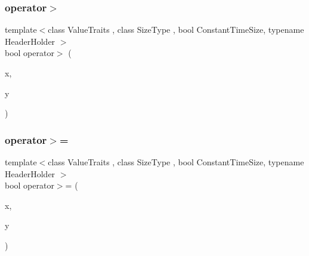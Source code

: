 \subsubsection{\texorpdfstring{operator$>$}{operator>}}
{\footnotesize\ttfamily template$<$class Value\+Traits , class Size\+Type , bool Constant\+Time\+Size, typename Header\+Holder $>$ \\
bool operator$>$ (\begin{DoxyParamCaption}\item[{const \hyperlink{classboost_1_1intrusive_1_1list__impl}{list\+\_\+impl}$<$ Value\+Traits, Size\+Type, Constant\+Time\+Size, Header\+Holder $>$ \&}]{x,  }\item[{const \hyperlink{classboost_1_1intrusive_1_1list__impl}{list\+\_\+impl}$<$ Value\+Traits, Size\+Type, Constant\+Time\+Size, Header\+Holder $>$ \&}]{y }\end{DoxyParamCaption})\hspace{0.3cm}{\ttfamily [friend]}}

\mbox{\label{classboost_1_1intrusive_1_1list__impl_a377468145b0d37be0290b44223a82d14}} 
\subsubsection{\texorpdfstring{operator$>$=}{operator>=}}
{\footnotesize\ttfamily template$<$class Value\+Traits , class Size\+Type , bool Constant\+Time\+Size, typename Header\+Holder $>$ \\
bool operator$>$= (\begin{DoxyParamCaption}\item[{const \hyperlink{classboost_1_1intrusive_1_1list__impl}{list\+\_\+impl}$<$ Value\+Traits, Size\+Type, Constant\+Time\+Size, Header\+Holder $>$ \&}]{x,  }\item[{const \hyperlink{classboost_1_1intrusive_1_1list__impl}{list\+\_\+impl}$<$ Value\+Traits, Size\+Type, Constant\+Time\+Size, Header\+Holder $>$ \&}]{y }\end{DoxyParamCaption})\hspace{0.3cm}{\ttfamily [friend]}}

\mbox{\label{classboost_1_1intrusive_1_1list__impl_ab912cfb4f0b466441be2a187fbe40c04}} 
